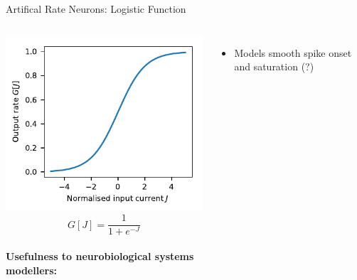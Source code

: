 \documentclass[handout,aspectratio=169]{beamer}
\begin{document}
\begin{frame}{Artifical Rate Neurons: Logistic Function}
	\begin{columns}
	\includegraphics[width=\textwidth]{media/nonlinearity_logistic.pdf}%
	$$G[J] = \frac{1}{1 + e^{-J}}$$\\[0.5cm]
	\textbf{Usefulness to neurobiological systems\\modellers:}
	\begin{itemize}
		\item[\OMeh] Models smooth spike onset and saturation (?)
	\end{itemize}
	\end{columns}	
\end{frame}
\end{document}
